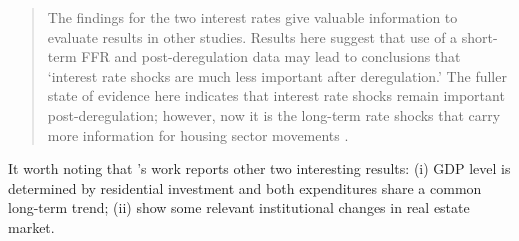 \documentclass[12pt, a4]{article}
\begin{document}
\begin{quote}
The findings for the two interest rates give valuable information to evaluate results in other studies. Results here suggest that use of a short-term FFR and post-deregulation data may lead to conclusions that `interest rate shocks are much less important after deregulation.' The fuller state of evidence here indicates that interest rate shocks remain important post-deregulation; however, now it is the long-term rate shocks that carry more information for housing sector movements \cite[p.~346]{gauger_residential_2003}.
\end{quote}
It worth noting that \citeauthor*{gauger_residential_2003}'s \citeyear{gauger_residential_2003} work reports other two interesting results:
	(i) GDP level is determined by residential investment and both expenditures share a common long-term trend;
	(ii) show some relevant institutional changes in real estate market.
\end{document}
